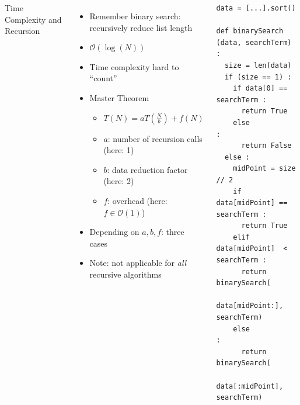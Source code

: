 \begin{frame}[fragile]
%
\begin{columns}[T]
\begin{Large}
	{Time Complexity and Recursion}
	\vspace{6pt}
\end{Large}
%
\begin{itemize}
\item Remember binary search: recursively reduce list length
\item $\mathcal{O}(\log(N))$
\item Time complexity hard to \enquote{count}
\item Master Theorem
	\begin{itemize}
	\item $T(N) = a T(\frac{N}{b}) + f(N)$
	\item $a$: number of recursion calls (here: 1)
	\item $b$: data reduction factor (here: 2)
	\item $f$: overhead (here: $f \in \mathcal{O}(1)$)
	\end{itemize}
\item Depending on $a, b, f$: three cases
\item Note: not applicable for \emph{all} recursive algorithms
\end{itemize}
%
\begin{codebox}
\begin{verbatim}
data = [...].sort()

def binarySearch (data, searchTerm) :
  size = len(data)
  if (size == 1) :
    if data[0] == searchTerm :
      return True
    else                     :
      return False
  else :
    midPoint = size // 2
    if   data[midPoint] == searchTerm :
      return True
    elif data[midPoint]  < searchTerm :
      return binarySearch(
        data[midPoint:], searchTerm)
    else                              :
      return binarySearch(
        data[:midPoint], searchTerm)
\end{verbatim}
\end{codebox}
\end{columns}
%
\end{frame}


